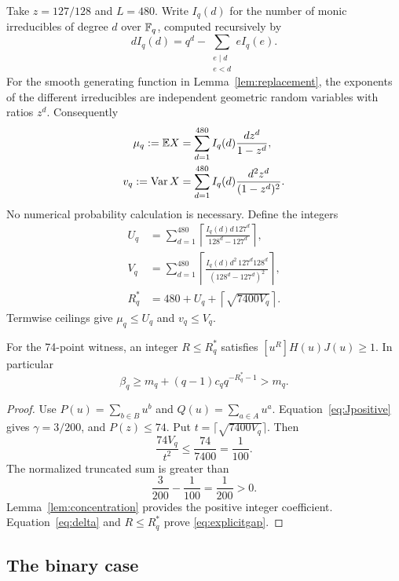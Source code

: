 Take \(z=127/128\) and \(L=480\). Write \(I_q(d)\) for the number of monic
irreducibles of degree \(d\) over \(\mathbb F_q\), computed recursively by
\begin{equation}\label{eq:irreducibles}
 dI_q(d)=q^d-\sum_{\substack{e\mid d\\e<d}}eI_q(e).
\end{equation}
For the smooth generating function in
Lemma~\ref{lem:replacement}, the exponents of the different irreducibles
are independent geometric random variables with ratios \(z^d\).
Consequently
\begin{align}
 \mu_q:=\mathbb E X
   &=\sum_{d=1}^{480}I_q(d)\frac{d z^d}{1-z^d},\\
 v_q:=\operatorname{Var} X
   &=\sum_{d=1}^{480}I_q(d)\frac{d^2 z^d}{(1-z^d)^2}.
\end{align}
No numerical probability calculation is necessary. Define the integers
\begin{align}
 U_q&=\sum_{d=1}^{480}
 \left\lceil\frac{I_q(d)d\,127^d}{128^d-127^d}\right\rceil,\\
 V_q&=\sum_{d=1}^{480}
 \left\lceil\frac{I_q(d)d^2\,127^d128^d}
 {(128^d-127^d)^2}\right\rceil,\\
 R_q^*&=480+U_q+\left\lceil\sqrt{7400V_q}\right\rceil.
 \label{eq:Rstar}
\end{align}
Termwise ceilings give \(\mu_q\le U_q\) and \(v_q\le V_q\).

\begin{theorem}\label{th:cutoff}
For the 74-point witness, an integer \(R\le R_q^*\) satisfies
\([u^R]H(u)J(u)\ge1\). In particular
\begin{equation}\label{eq:explicitgap}
 \beta_q\ge m_q+(q-1)c_q q^{-R_q^*-1}>m_q.
\end{equation}
\end{theorem}

\begin{proof}
Use \(P(u)=\sum_{b\in B}u^b\) and
\(Q(u)=\sum_{a\in A}u^a\).
Equation~\eqref{eq:Jpositive} gives \(\gamma=3/200\), and
\(P(z)\le74\). Put \(t=\lceil\sqrt{7400V_q}\rceil\).
Then
\[
 \frac{74V_q}{t^2}\le\frac{74}{7400}=\frac1{100}.
\]
The normalized truncated sum is greater than
\[
 \frac3{200}-\frac1{100}=\frac1{200}>0.
\]
Lemma~\ref{lem:concentration} provides the positive integer coefficient.
Equation~\eqref{eq:delta} and \(R\le R_q^*\) prove
\eqref{eq:explicitgap}.
\end{proof}

\subsection{The binary case}

